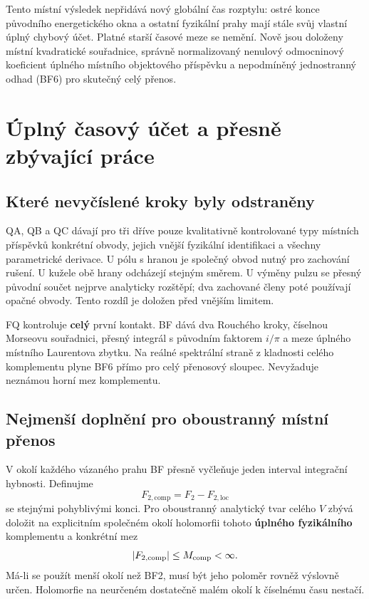 \documentclass[11pt,a4paper]{article}
\theoremstyle{remark}\newtheorem{remark}[theorem]{Poznámka}
\numberwithin{equation}{section}
\begin{document}
Tento místní výsledek nepřidává nový globální čas rozptylu: ostré konce
původního energetického okna a ostatní fyzikální prahy mají stále svůj
vlastní úplný chybový účet. Platné starší časové meze se nemění. Nově
jsou doloženy místní kvadratické souřadnice, správně normalizovaný
nenulový odmocninový koeficient úplného místního objektového příspěvku a
nepodmíněný jednostranný odhad (BF6) pro skutečný celý přenos.


\section{Úplný časový účet a přesně zbývající práce}

\subsection{Které nevyčíslené kroky byly odstraněny}

QA, QB a QC dávají pro tři dříve pouze kvalitativně
kontrolované typy místních příspěvků konkrétní obvody,
jejich vnější fyzikální identifikaci a všechny parametrické
derivace. U pólu s hranou je společný obvod nutný pro
zachování rušení. U kužele obě hrany odcházejí stejným
směrem. U výměny pulzu se přesný původní součet nejprve
analyticky rozštěpí; dva zachované členy poté používají
opačné obvody. Tento rozdíl je doložen před vnějším limitem.

FQ kontroluje \textbf{celý} první kontakt. BF dává dva
Rouchého kroky, číselnou Morseovu souřadnici, přesný
integrál s původním faktorem \(i/\pi\) a meze úplného
místního Laurentova zbytku. Na reálné spektrální straně
z kladnosti celého komplementu plyne BF6 přímo pro celý
přenosový sloupec. Nevyžaduje neznámou horní mez komplementu.

\subsection{Nejmenší doplnění pro oboustranný místní přenos}

V okolí každého vázaného prahu BF přesně vyčleňuje jeden
interval integrační hybnosti. Definujme
\[
F_{2,\mathrm{comp}}=F_2-F_{2,\mathrm{loc}}
\]
se stejnými pohyblivými konci. Pro oboustranný analytický
tvar celého \(V\) zbývá doložit na explicitním společném
okolí holomorfii tohoto \textbf{úplného fyzikálního}
komplementu a konkrétní mez
\[
|F_{2,\mathrm{comp}}|\le M_{\rm comp}<\infty.
\]
Má-li se použít menší okolí než BF2, musí být jeho poloměr
rovněž výslovně určen. Holomorfie na neurčeném dostatečně
malém okolí k číselnému času nestačí.
\end{document}
